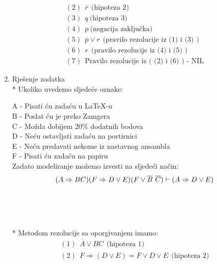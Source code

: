 \documentclass[12pt]{article}
\begin{document}
\begin{enumerate}
\begin{align*}
		    (2)~~ \overline{r} ~~ \text{(hipoteza~2)} \\
		    
		    (3)~~ q ~\text{(hipoteza~3)} \\
		    
		    (4)~~ p ~\text{(negacija zaključka)} \\
		    
		    (5)~~ \overline{p} \vee r ~~\text{(pravilo~rezolucije~iz~(1)~i~(3)~)} \\
		    
		    (6)~~ r ~~\text{(pravilo~rezolucije~iz~(4)~i~(5)~)} \\
		    
		    (7)~~ \text{Pravilo~rezolucije~iz~(~(2)~i~(6)~)~-~NIL}
		    
		\end{align*}
		
		\item Rješenje zadatka \\
		
		* Ukoliko uvedemo sljedeće oznake:
		
		A - Pisati ću zadaću u LaTeX-u \\
		B - Poslat ću je preko Zamgera \\
		C - Možda dobijem 20\% dodatnih bodova \\
		D - Neću ostavljati zadaću na portirnici \\
		E - Neću predavati nekome iz nastavnog ansambla \\
		F - Pisati ću zadaću na papiru \\
		
		Zadato modeliranje možemo izvesti na sljedeći način:
		\begin{equation*}
		    (A \Rightarrow BC)(F \Rightarrow D \vee E)(F \vee \overline{B}~\overline{C}) \vdash (A \Rightarrow D \vee E) \\
		    
		\end{equation*}
		\\
		\\
		\\
		\\
		
		* Metodom rezolucije sa oporgivanjem imamo: 
		\begin{align*}
		    
		    (1)~~ \overline{A} \vee BC ~~ \text{(hipoteza 1)}\\
		    
		    (2)~~ F \Rightarrow (D \vee E) = \overline{F} \vee D \vee E ~~ \text{(hipoteza 2)} \\
		    

\end{align*}
\end{enumerate}
\end{document}
